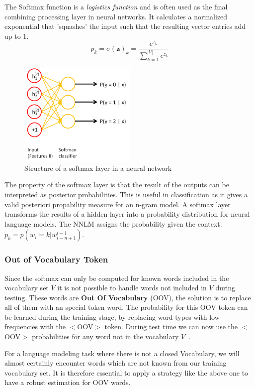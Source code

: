 The Softmax function is a \textit{logistics function} and is often used as the final combining processing layer in neural
networks. It calculates a normalized exponential that 'squashes' the input such that the resulting vector entries add up to 1.
\[
    p_k = \sigma(\mathbf{z})_k = \frac{e^{z_k}}{\sum_{k=1}^{|V|} e^{z_k}}
\]
\begin{figure}[H]
\begin{center}
  \includegraphics[width=0.5\textwidth]{./img/softmax_layer}
  \caption{Structure of a softmax layer in a neural network}
  \label{fig:softmax_layer}
\end{center}
\end{figure}

The property of the softmax layer is that the result of the outputs can be interpreted as posterior probabilities. 
This is useful in classification as it gives a valid posteriori propability measure for an n-gram model.
A softmax layer transforms the results of a hidden layer into a probability distribution for neural language models. The NNLM assigns the
probability given the context: $p_k = p(w_i = k | w_{i-n+1}^{i-1})$.

\subsubsection{Out of Vocabulary Token}

Since the softmax can only be computed for known words included in the vocabulary set $V$ it is not possible to handle words
not included in $V$ during testing.
These words are \textbf{Out Of Vocabulary} (OOV), the solution is to replace all of them with an special token word.
The probability for this OOV token can be learned during the training stage, by replacing word types with low frequencies with the $<$OOV$>$ token.
During test time we can now use the $<$OOV$>$ probabilities for any word not in the vocabulary $V$~\cite{DBLP:journals/corr/LingLMAADBT15}.

For a language modeling task where there is not a closed Vocabulary, we will almost certainly encounter words which are not known from
our training vocabulary set. It is therefore essential to apply a strategy like the above one to have a robust estimation
for OOV words.

